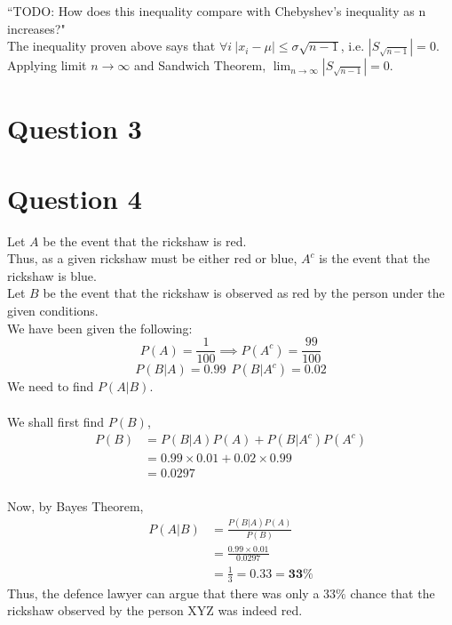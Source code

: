 \documentclass[11pt]{article}
\begin{document}
``TODO: How does this inequality compare with Chebyshev's inequality as n increases?"\\
The inequality proven above says that $\forall i \ |x_i - \mu| \le \sigma \sqrt{n-1}$, i.e. $|S_{\sqrt{n-1}}| = 0$.\\
Applying limit $n \to \infty$ and Sandwich Theorem, $\lim_{n\to\infty} |S_{\sqrt{n-1}}| = 0$.

\newpage
\section{Question 3}

\newpage
\section{Question 4}
Let $A$ be the event that the rickshaw is red.\\
Thus, as a given rickshaw must be either red or blue, $A^c$ is the event that the rickshaw is blue.\\
Let $B$ be the event that the rickshaw is observed as red by the person under the given conditions.\\
We have been given the following:
$$
    P(A) = \frac{1}{100} \implies P(A^c) = \frac{99}{100}
$$
$$
    P(B|A) = 0.99 \ \  P(B|A^c) = 0.02
$$
We need to find $P(A|B)$. \\
\\
We shall first find $P(B)$,
$$
    \begin{aligned}
        P(B) & = P(B|A)P(A) + P(B|A^c)P(A^c)     \\
             & = 0.99\times0.01 + 0.02\times0.99 \\
             & = 0.0297
    \end{aligned}
$$
\\
Now, by Bayes Theorem,
$$
    \begin{aligned}
        P(A|B) & = \frac{P(B|A)P(A)}{P(B)}            \\
               & = \frac{0.99\times0.01}{0.0297}      \\
               & = \frac{1}{3} = 0.33 = \mathbf{33\%}
    \end{aligned}
$$
Thus, the defence lawyer can argue that there was only a $33\%$ chance that the rickshaw observed by the person XYZ was indeed red.

\newpage
\end{document}
